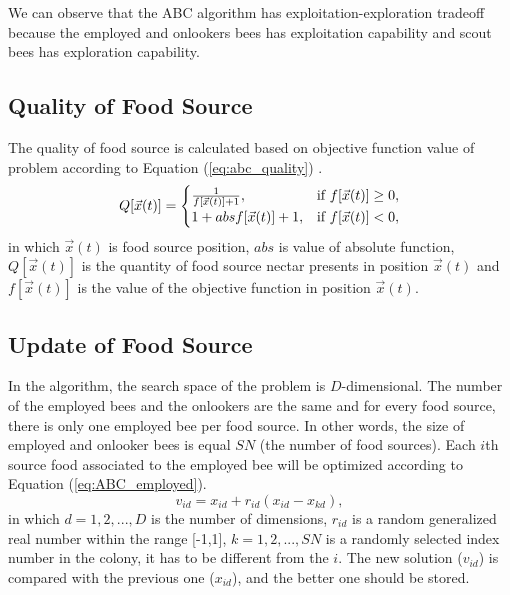We can observe that the ABC algorithm has exploitation-exploration tradeoff because the employed and onlookers bees has exploitation capability and scout bees has exploration capability.

\subsection{Quality of Food Source}
The quality of food source is calculated based on objective function value of problem according to Equation (\ref{eq:abc_quality}) \cite{ABC:Murgan2012}.
\begin{equation}
Q[\vec{x}(t)] = \begin{cases}
\frac{1}{f[\vec{x}(t)]+1}, &\mbox{if $ f[\vec{x}(t)] \geq 0 $}, \\
1+abs{f[\vec{x}(t)]+1},    &\mbox{if $ f[\vec{x}(t)] < 0 $}, \\
\end{cases}
\label{eq:abc_quality}
\end{equation}
in which $\vec{x}(t)$ is food source position, $abs$ is value of absolute function, $Q[\vec{x}(t)]$ is the quantity of food source nectar presents in position $\vec{x}(t)$ and $f[\vec{x}(t)]$ is the value of the objective function in position $\vec{x}(t)$.

\subsection{Update of Food Source}
In the algorithm, the search space of the problem is $D$-dimensional. The number of the employed bees and the onlookers are the same and for every food source, there is only one employed bee per food source. In other words, the size of employed and onlooker bees is equal $SN$ (the number of food sources). Each $i$th source food associated to the employed bee will be optimized according to Equation (\ref{eq:ABC_employed}).
\begin{equation}\label{eq:ABC_employed}
v_{id} = x_{id} + r_{id}(x_{id} - x_{kd}),
\end{equation}
in which $d = 1,2,...,D$ is the number of dimensions, $r_{id}$ is a random generalized real number within the range [-1,1], $k = 1,2,...,SN$ is a randomly selected index number in the colony, it has to be different from the $i$. The new solution ($v_{id}$) is compared with the previous one ($x_{id}$), and the better one should be stored.

